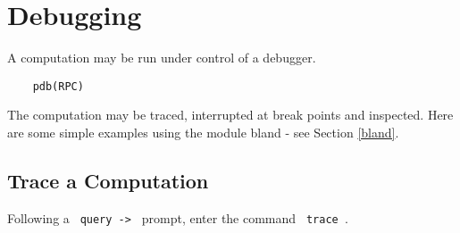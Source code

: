 \section{Debugging}
\label{debugger}
A computation may be run under control of a debugger.

\begin{verbatim}
    pdb(RPC)
\end{verbatim}

\noindent
The computation may be traced, interrupted at break points and
inspected.  Here are some simple examples using the module bland -
see Section \ref{bland}.

\subsection{Trace a Computation}
\label{debug trace}

Following a \verb+ query -> + prompt, enter the command \verb+ trace +.

